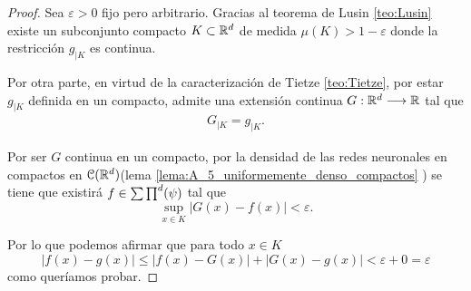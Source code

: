     \reversemarginpar
    \setlength{\marginparwidth}{\smallMarginSize}

    \setlength{\marginparwidth}{\bigMarginSize}
    \normalmarginpar
    
\begin{proof}
    Sea $\varepsilon > 0$ fijo pero arbitrario.  Gracias al teorema de Lusin \ref{teo:Lusin}
    existe un subconjunto compacto $K \subset \mathbb{R}^d$ de medida
    $\mu(K) > 1 - \varepsilon$ donde la restricción  $g_{|K}$ es continua. 

    Por otra parte, en virtud de la caracterización de Tietze 
    \ref{teo:Tietze}, 
    por estar $g_{|K}$ definida en un compacto, admite una 
    extensión continua $G:\mathbb{R}^d \longrightarrow \mathbb{R}$ tal que 
    \begin{equation}
        \begin{split}
            G_{|K} = g_{|K} .
        \end{split}
    \end{equation}

    Por ser $G$ continua en un compacto, por la densidad de las redes neuronales en compactos en $\mathcal{C}(\mathbb{R}^d)$(lema \ref{lema:A_5_uniformemente_denso_compactos} ) se tiene que existirá 
     $f \in \sum \prod^d (\psi)$ tal que 
    \begin{equation}
        \sup_{x \in K} |G(x) - f(x)| < \varepsilon.
    \end{equation}

    Por lo que podemos afirmar que para todo $x \in K$
    \begin{equation}
        |f(x) -g(x)| 
        \leq 
        | f(x) -G(x)| + |G(x) -g(x)|
        < \varepsilon + 0 = \varepsilon
    \end{equation}
    como queríamos probar.
\end{proof}


